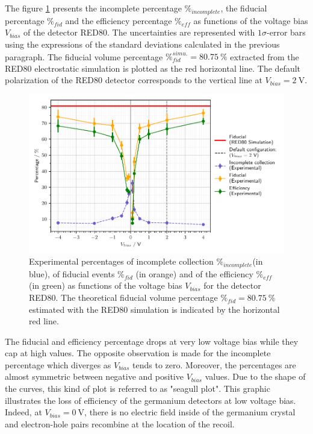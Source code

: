 The figure \ref{fig:red80-experimental-fiducial-volume} presents the incomplete percentage $\%_{incomplete}$, the fiducial percentage $\%_{fid}$ and the efficiency percentage $\%_{eff}$ as functions of the voltage bias $V_{bias}$ of the detector RED80. The uncertainties are represented with $1\sigma$-error bars using the expressions of the standard deviations calculated in the previous paragraph. The fiducial volume percentage $\%_{fid}^{simu.}=\SI{80.75}{\percent}$ extracted from the RED80 electrostatic simulation is plotted as the red horizontal line. The default polarization of the RED80 detector corresponds to the vertical line at $V_{bias}=\SI{2}{\volt}$.

\begin{figure}
\centering
\includegraphics[scale=1]{Figures/ElectrodesExperimental/red80_experimental_fiducial_volume.pdf}
\caption{Experimental percentages of incomplete collection $\%_{incomplete}$(in blue), of fiducial events $\%_{fid}$ (in orange) and of the efficiency $\%_{eff}$ (in green) as functions of the voltage bias $V_{bias}$ for the detector RED80. The theoretical fiducial volume percentage $\%_{fid}=\SI{80.75}{\percent}$ estimated with the RED80 simulation is indicated by the horizontal red line.}
\label{fig:red80-experimental-fiducial-volume}
\end{figure}

The fiducial and efficiency percentage drops at very low voltage bias while they cap at high values. The opposite observation is made for the incomplete percentage which diverges as $V_{bias}$ tends to zero. Moreover, the percentages are almost symmetric between negative and positive $V_{bias}$ values. Due to the shape of the curves, this kind of plot is referred to as "seagull plot". This graphic illustrates the loss of efficiency of the germanium detectors at low voltage bias. Indeed, at $V_{bias}=\SI{0}{\volt}$, there is no electric field inside of the germanium crystal and electron-hole pairs recombine at the location of the recoil. 

